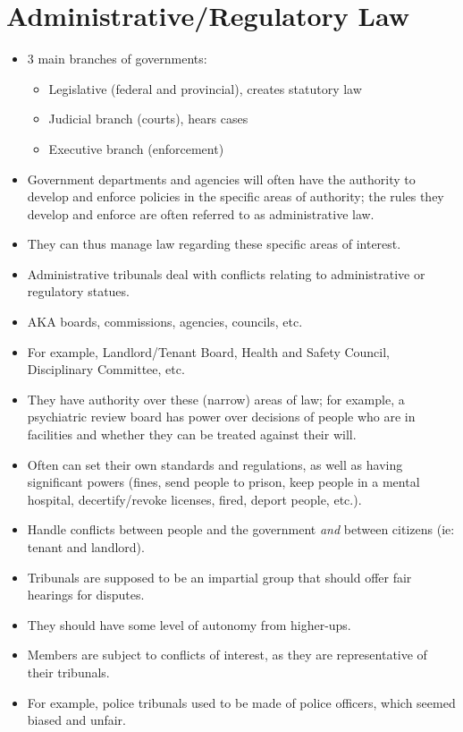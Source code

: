 \documentclass{article}
\begin{document}
\section{Administrative/Regulatory Law}
\begin{itemize}
    \item 3 main branches of governments:
        \begin{itemize}
            \item Legislative (federal and provincial), creates statutory law
            \item Judicial branch (courts), hears cases
            \item Executive branch (enforcement)
        \end{itemize}
    \item Government departments and agencies will often have the authority to develop and enforce policies in the specific areas of authority; the rules they develop and enforce are often referred to as administrative law.
    \item They can thus manage law regarding these specific areas of interest.
    \item Administrative tribunals deal with conflicts relating to administrative or regulatory statues.
    \item AKA boards, commissions, agencies, councils, etc.
    \item For example, Landlord/Tenant Board, Health and Safety Council, Disciplinary Committee, etc.
    \item They have authority over these (narrow) areas of law; for example, a psychiatric review board has power over decisions of people who are in facilities and whether they can be treated against their will.
    \item Often can set their own standards and regulations, as well as having significant powers (fines, send people to prison, keep people in a mental hospital, decertify/revoke licenses, fired, deport people, etc.).
    \item Handle conflicts between people and the government \emph{and} between citizens (ie: tenant and landlord).
    \item Tribunals are supposed to be an impartial group that should offer fair hearings for disputes.
    \item They should have some level of autonomy from higher-ups.
    \item Members are subject to conflicts of interest, as they are representative of their tribunals.
    \item For example, police tribunals used to be made of police officers, which seemed biased and unfair.

\end{itemize}
\end{document}
